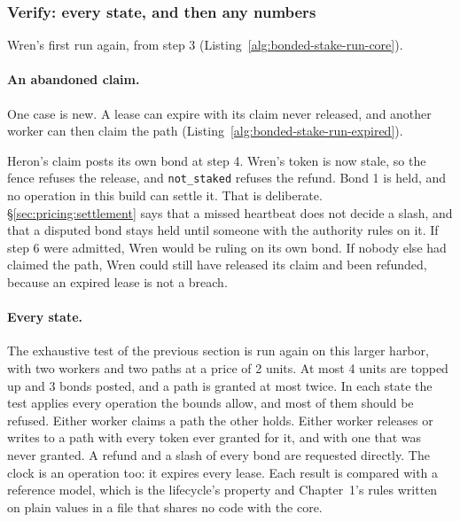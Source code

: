\subsubsection{Verify: every state, and then any numbers}

Wren's first run again, from step 3
(Listing~\ref{alg:bonded-stake-run-core}).


\paragraph{An abandoned claim.}
One case is new. A lease can expire with its claim never released, and
another worker can then claim the path
(Listing~\ref{alg:bonded-stake-run-expired}).


Heron's claim posts its own bond at step 4. Wren's token is now stale, so
the fence refuses the release, and \texttt{not\_staked} refuses the
refund. Bond 1 is held, and no operation in this build can settle it. That
is deliberate. \S\ref{sec:pricing:settlement} says that a missed heartbeat
does not decide a slash, and that a disputed bond stays held until someone
with the authority rules on it. If step 6 were admitted, Wren would be
ruling on its own bond. If nobody else had claimed the path, Wren could
still have released its claim and been refunded, because an expired lease
is not a breach.

\paragraph{Every state.}
The exhaustive test of the previous section is run again on this larger
harbor, with two workers and two paths at a price of 2 units. At most 4
units are topped up and 3 bonds posted, and a path is granted at most
twice. In each state the test applies every operation the bounds allow,
and most of them should be refused. Either worker claims a path the other
holds. Either worker releases or writes to a path with every token ever
granted for it, and with one that was never granted. A refund and a slash
of every bond are requested directly. The clock is an operation too: it
expires every lease. Each result is compared with a reference model, which
is the lifecycle's property and Chapter~1's rules written on plain values
in a file that shares no code with the core.

